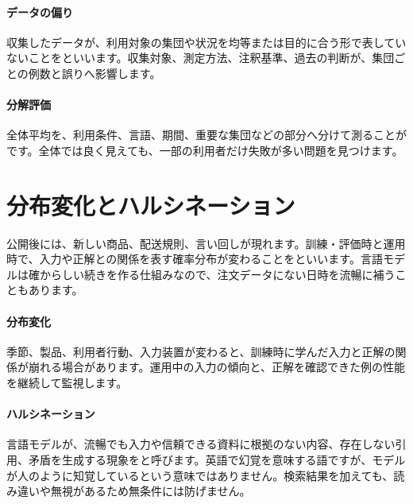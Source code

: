 \par
\endgroup
\medskip
\begingroup
\paragraph{データの偏り}
        収集したデータが、利用対象の集団や状況を均等または目的に合う形で表していないことをといいます。収集対象、測定方法、注釈基準、過去の判断が、集団ごとの例数と誤りへ影響します。

\paragraph{分解評価}
        全体平均を、利用条件、言語、期間、重要な集団などの部分へ分けて測ることがです。全体では良く見えても、一部の利用者だけ失敗が多い問題を見つけます。

\par
\endgroup
\par
\endgroup


\section{分布変化とハルシネーション}
\label{sec:06-machine-learning-33}

公開後には、新しい商品、配送規則、言い回しが現れます。訓練・評価時と運用時で、入力や正解との関係を表す確率分布が変わることをといいます。言語モデルは確からしい続きを作る仕組みなので、注文データにない日時を流暢に補うこともあります。

\begingroup
\begingroup
\paragraph{分布変化}
        季節、製品、利用者行動、入力装置が変わると、訓練時に学んだ入力と正解の関係が崩れる場合があります。運用中の入力の傾向と、正解を確認できた例の性能を継続して監視します。

\par
\endgroup
\medskip
\begingroup
\paragraph{ハルシネーション}
        言語モデルが、流暢でも入力や信頼できる資料に根拠のない内容、存在しない引用、矛盾を生成する現象をと呼びます。英語で幻覚を意味する語ですが、モデルが人のように知覚しているという意味ではありません。検索結果を加えても、読み違いや無視があるため無条件には防げません。

